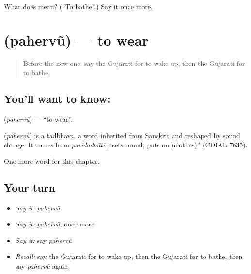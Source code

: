 \begin{tcolorbox}[breakable,colback=teal!4,colframe=teal!35!black,title={Before you move on}]
What does  mean? (\textquotedblleft{}To bathe\textquotedblright{}.) Say it once more.
\end{tcolorbox}
\section[\texorpdfstring{\gu{પહેરવું} (pahervũ)}{પહેરવું (pahervũ)}]{ (pahervũ) — to wear}

\label{lesson:GU-C141-pahervu}



\begin{quote}
Before the new one: say the Gujarati for to wake up, then the Gujarati for to bathe.
\end{quote}

\subsection*{You'll want to know: }
\textbf{} (\emph{pahervũ}) — \textquotedblleft{}to wear\textquotedblright{}.

\begin{cousinweb}
\textbf{} (\emph{pahervũ}) is a tadbhava, a word inherited from Sanskrit and reshaped by sound change. It comes from \emph{paridadhāti}, \textquotedblleft{}sets round; puts on (clothes)\textquotedblright{} (CDIAL 7835).
\end{cousinweb}

\begin{grammarlens}[title={What you've built}]
One more word for this chapter.
\end{grammarlens}

\subsection*{Your turn}
\begin{itemize}
\raggedright
  \item \emph{Say it:} \emph{pahervũ}
  \item \emph{Say it:} \emph{pahervũ}, once more
  \item \emph{Say it:} say \emph{pahervũ}
  \item \emph{Recall:} say the Gujarati for to wake up, then the Gujarati for to bathe, then say \emph{pahervũ} again
\end{itemize}

